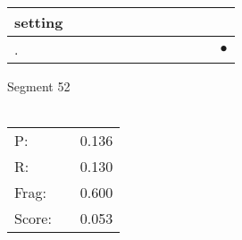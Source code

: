 \documentclass[landscape]{article}
\newcommand{\ssp}{\hspace{2pt}}
\newcommand{\mex}{\cellcolor{g}$\bullet$}
\begin{document}
\begin{tabular}{|l|p{10pt}|p{10pt}|p{10pt}|p{10pt}|p{10pt}|p{10pt}|p{10pt}|p{10pt}|p{10pt}|p{10pt}|p{10pt}|}
\hline
\ssp setting \ssp&\hspace{2pt}&\hspace{2pt}&\hspace{2pt}&\hspace{2pt}&\hspace{2pt}&\hspace{2pt}&\hspace{2pt}&\hspace{2pt}&\hspace{2pt}&\hspace{2pt}&\hspace{2pt}\\
\hline
\ssp \cellcolor{ref10}. \ssp&\hspace{2pt}&\hspace{2pt}&\hspace{2pt}&\hspace{2pt}&\hspace{2pt}&\hspace{2pt}&\hspace{2pt}&\hspace{2pt}&\hspace{2pt}&\hspace{2pt}&\hspace{2pt}\mex\\
\hline
\end{tabular}

\vspace{6pt}
\noindent Segment 52\\\\
\noindent\begin{tabular}{lm{12pt}r}
\hline
P:&&0.136\\
R:&&0.130\\
Frag:&&0.600\\
Score:&&0.053\\
\end{tabular}

\newpage
\end{document}
